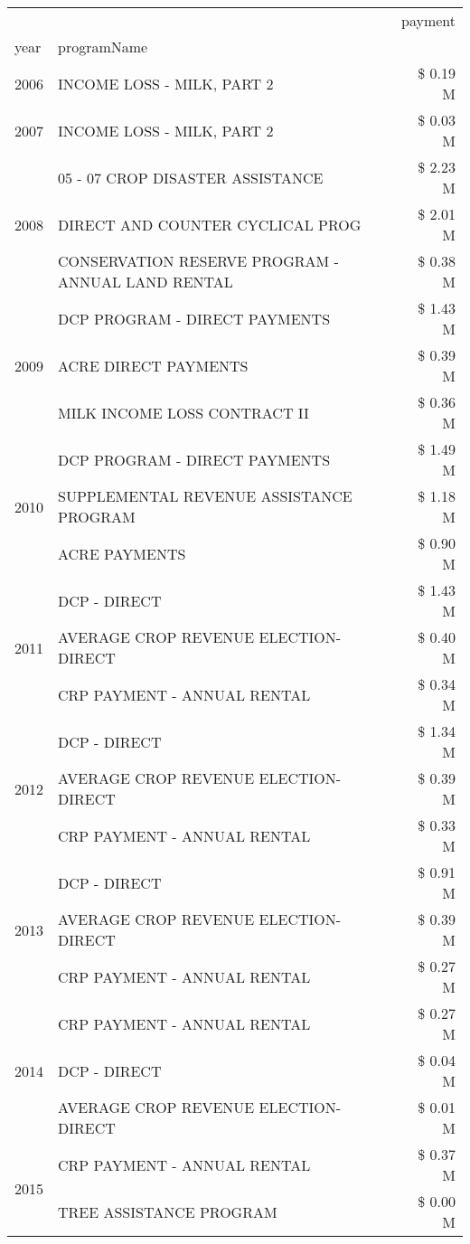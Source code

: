 \begin{tabular}{llr}
\toprule
 &  & payment \\
year & programName &  \\
\midrule
2006 & INCOME LOSS - MILK, PART 2 & \$ 0.19 M \\
\cline{1-3}
2007 & INCOME LOSS - MILK, PART 2 & \$ 0.03 M \\
\cline{1-3}
\multirow[t]{3}{*}{2008} & 05 - 07 CROP DISASTER ASSISTANCE & \$ 2.23 M \\
 & DIRECT AND COUNTER CYCLICAL PROG & \$ 2.01 M \\
 & CONSERVATION RESERVE PROGRAM - ANNUAL LAND RENTAL & \$ 0.38 M \\
\cline{1-3}
\multirow[t]{3}{*}{2009} & DCP PROGRAM - DIRECT PAYMENTS & \$ 1.43 M \\
 & ACRE DIRECT PAYMENTS & \$ 0.39 M \\
 & MILK INCOME LOSS CONTRACT II & \$ 0.36 M \\
\cline{1-3}
\multirow[t]{3}{*}{2010} & DCP PROGRAM - DIRECT PAYMENTS & \$ 1.49 M \\
 & SUPPLEMENTAL REVENUE ASSISTANCE PROGRAM & \$ 1.18 M \\
 & ACRE PAYMENTS & \$ 0.90 M \\
\cline{1-3}
\multirow[t]{3}{*}{2011} & DCP - DIRECT & \$ 1.43 M \\
 & AVERAGE CROP REVENUE ELECTION-DIRECT & \$ 0.40 M \\
 & CRP PAYMENT - ANNUAL RENTAL & \$ 0.34 M \\
\cline{1-3}
\multirow[t]{3}{*}{2012} & DCP - DIRECT & \$ 1.34 M \\
 & AVERAGE CROP REVENUE ELECTION-DIRECT & \$ 0.39 M \\
 & CRP PAYMENT - ANNUAL RENTAL & \$ 0.33 M \\
\cline{1-3}
\multirow[t]{3}{*}{2013} & DCP - DIRECT & \$ 0.91 M \\
 & AVERAGE CROP REVENUE ELECTION-DIRECT & \$ 0.39 M \\
 & CRP PAYMENT - ANNUAL RENTAL & \$ 0.27 M \\
\cline{1-3}
\multirow[t]{3}{*}{2014} & CRP PAYMENT - ANNUAL RENTAL & \$ 0.27 M \\
 & DCP - DIRECT & \$ 0.04 M \\
 & AVERAGE CROP REVENUE ELECTION-DIRECT & \$ 0.01 M \\
\cline{1-3}
\multirow[t]{3}{*}{2015} & CRP PAYMENT - ANNUAL RENTAL & \$ 0.37 M \\
 & TREE ASSISTANCE PROGRAM & \$ 0.00 M \\

\end{tabular}
